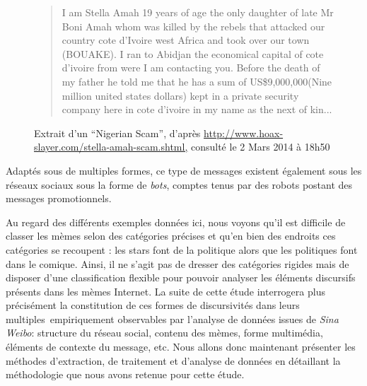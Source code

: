 \begin{description}
\begin{figure}
    \begin{quote}
        I am Stella Amah 19 years of age the only daughter of late Mr Boni Amah whom was killed by the rebels that attacked our country cote d'Ivoire west Africa and took over our town (BOUAKE). I ran to Abidjan the economical capital of cote d'ivoire from were I am contacting you. Before the death of my father he told me that he has a sum of US\$9,000,000(Nine million united states dollars) kept in a private security company here in cote d'ivoire in my name as the next of kin... 
    \end{quote}
    \caption[Extrait d'un spam du type \textit{Nigerian Scam}]{
        Extrait d{\textquoteright}un {\textquotedblleft}Nigerian Scam{\textquotedblright}, d{\textquoteright}apr\`es \url{http://www.hoax-slayer.com/stella-amah-scam.shtml,} consult\'e le 2 Mars 2014 \`a 18h50
    }
    \label{fig:nigerian-scam}
\end{figure}

Adapt\'es sous de multiples formes, ce type de messages existent \'egalement sous les r\'eseaux sociaux sous la forme de \textit{bots}, comptes tenus par des robots postant des messages promotionnels. 

\end{description}

Au regard des diff\'erents exemples donn\'ees ici, nous voyons qu{\textquoteright}il est difficile de classer les m\`emes selon des cat\'egories pr\'ecises et qu{\textquoteright}en bien des endroits ces cat\'egories se recoupent : les stars font de la politique alors que les politiques font dans le comique. Ainsi, il ne s{\textquoteright}agit pas de dresser des cat\'egories rigides mais de disposer d{\textquoteright}une classification flexible pour pouvoir analyser les \'el\'ements discursifs pr\'esents dans les m\`emes Internet. La suite de cette \'etude interrogera plus pr\'ecis\'ement la constitution de ces formes de discursivit\'es dans leurs multiples~empiriquement observables par l{\textquoteright}analyse de donn\'ees issues de \textit{Sina Weibo}: structure du r\'eseau social, contenu des m\`emes, forme multim\'edia, \'el\'ements de contexte du message, etc. Nous allons donc maintenant pr\'esenter les m\'ethodes d{\textquoteright}extraction, de traitement et d{\textquoteright}analyse de donn\'ees en d\'etaillant la m\'ethodologie que nous avons retenue pour cette \'etude.